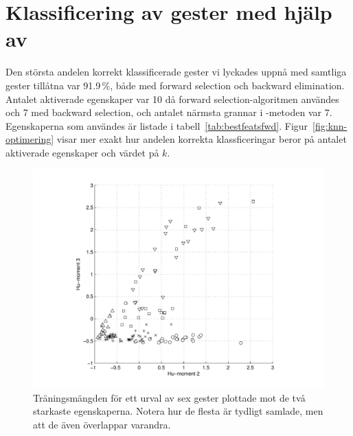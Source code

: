 \documentclass[../rapport_MVEX01-11-05]{subfiles}
\begin{document}
\section{Klassificering av gester med hjälp av \knn}
Den största andelen korrekt klassificerade gester vi lyckades uppnå
med samtliga gester tillåtna var 91.9\,\%, både med forward selection
och backward elimination. Antalet aktiverade
egenskaper var 10 då forward selection-algoritmen användes och 7 med
backward selection, och antalet närmsta grannar i \knn-metoden var 7. Egenskaperna som
användes är listade i
tabell~\vref{tab:bestfeatsfwd}. Figur~\vref{fig:knn-optimering} visar mer
exakt hur andelen korrekta
klassficeringar beror på antalet aktiverade egenskaper och värdet på $k$.

\begin{figure}[tbp]
  \centering
  \includegraphics[width=\textwidth,trim=2cm 0.5cm 2cm 0,clip=true]{bilder/feats-10+11}
  \caption{Träningsmängden för ett urval av sex gester plottade mot de två
	starkaste egenskaperna. Notera hur de flesta är tydligt samlade, men att
	de även överlappar varandra.}
  \label{fig:feats1011}
\end{figure}
\end{document}
